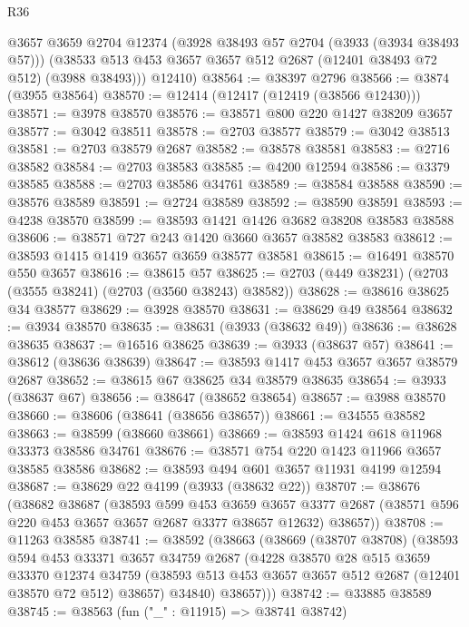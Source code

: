 \begin{lexlean}{R36}
\begin{coremodule}
        @3657
        @3659
        @2704
        @12374
        (@3928 @38493 @57 @2704 (@3933 (@3934 @38493 @57)))
        (@38533 @513 @453 @3657 @3657 @512 @2687 (@12401 @38493 @72 @512) (@3988 @38493)))
      @12410)
@38564 := @38397 @2796
@38566 := @3874 (@3955 @38564)
@38570 := @12414 (@12417 (@12419 (@38566 @12430)))
@38571 := @3978 @38570
@38576 := @38571 @800 @220 @1427 @38209 @3657
@38577 := @3042 @38511
@38578 := @2703 @38577
@38579 := @3042 @38513
@38581 := @2703 @38579 @2687
@38582 := @38578 @38581
@38583 := @2716 @38582
@38584 := @2703 @38583
@38585 := @4200 @12594
@38586 := @3379 @38585
@38588 := @2703 @38586 @34761
@38589 := @38584 @38588
@38590 := @38576 @38589
@38591 := @2724 @38589
@38592 := @38590 @38591
@38593 := @4238 @38570
@38599 := @38593 @1421 @1426 @3682 @38208 @38583 @38588
@38606 := @38571 @727 @243 @1420 @3660 @3657 @38582 @38583
@38612 := @38593 @1415 @1419 @3657 @3659 @38577 @38581
@38615 := @16491 @38570 @550 @3657
@38616 := @38615 @57
@38625 := @2703 (@449 @38231) (@2703 (@3555 @38241) (@2703 (@3560 @38243) @38582))
@38628 := @38616 @38625 @34 @38577
@38629 := @3928 @38570
@38631 := @38629 @49 @38564
@38632 := @3934 @38570
@38635 := @38631 (@3933 (@38632 @49))
@38636 := @38628 @38635
@38637 := @16516 @38625
@38639 := @3933 (@38637 @57)
@38641 := @38612 (@38636 @38639)
@38647 := @38593 @1417 @453 @3657 @3657 @38579 @2687
@38652 := @38615 @67 @38625 @34 @38579 @38635
@38654 := @3933 (@38637 @67)
@38656 := @38647 (@38652 @38654)
@38657 := @3988 @38570
@38660 := @38606 (@38641 (@38656 @38657))
@38661 := @34555 @38582
@38663 := @38599 (@38660 @38661)
@38669 := @38593 @1424 @618 @11968 @33373 @38586 @34761
@38676 := @38571 @754 @220 @1423 @11966 @3657 @38585 @38586
@38682 := @38593 @494 @601 @3657 @11931 @4199 @12594
@38687 := @38629 @22 @4199 (@3933 (@38632 @22))
@38707 := @38676
    (@38682
      @38687
      (@38593
        @599
        @453
        @3659
        @3657
        @3377
        @2687
        (@38571 @596 @220 @453 @3657 @3657 @2687 @3377 @38657 @12632)
        @38657))
@38708 := @11263 @38585
@38741 := @38592
    (@38663
      (@38669
        (@38707 @38708)
        (@38593
          @594
          @453
          @33371
          @3657
          @34759
          @2687
          (@4228
            @38570
            @28
            @515
            @3659
            @33370
            @12374
            @34759
            (@38593 @513 @453 @3657 @3657 @512 @2687 (@12401 @38570 @72 @512) @38657)
            @34840)
          @38657)))
@38742 := @33885 @38589
@38745 := @38563 (fun ("_" : @11915) => @38741 @38742)

\end{coremodule}
\end{lexlean}
